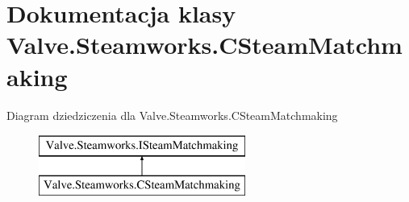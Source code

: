 \hypertarget{class_valve_1_1_steamworks_1_1_c_steam_matchmaking}{}\section{Dokumentacja klasy Valve.\+Steamworks.\+C\+Steam\+Matchmaking}
\label{class_valve_1_1_steamworks_1_1_c_steam_matchmaking}
Diagram dziedziczenia dla Valve.\+Steamworks.\+C\+Steam\+Matchmaking\begin{figure}[H]
\begin{center}
\leavevmode
\includegraphics[height=2.000000cm]{class_valve_1_1_steamworks_1_1_c_steam_matchmaking}
\end{center}
\end{figure}
